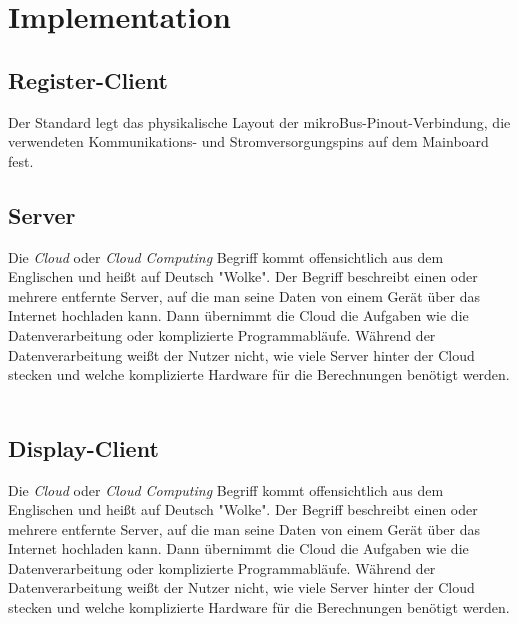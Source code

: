 \chapter{Implementation}

\section{Register-Client}
\label{sec:register_client}
Der Standard legt das physikalische Layout der mikroBus-Pinout-Verbindung, die verwendeten Kommunikations- und Stromversorgungspins auf dem Mainboard fest. 

\section{Server}
\label{sec:server}
Die \textit{Cloud} oder \textit{Cloud Computing} Begriff kommt offensichtlich aus dem Englischen und heißt auf Deutsch "Wolke". Der Begriff beschreibt einen oder mehrere entfernte Server, auf die man seine Daten von einem Gerät über das Internet hochladen kann. Dann übernimmt die Cloud die Aufgaben wie die Datenverarbeitung oder komplizierte Programmabläufe. Während der Datenverarbeitung weißt der Nutzer nicht, wie viele Server hinter der Cloud stecken und welche komplizierte Hardware für die Berechnungen benötigt werden.\\\\

\section{Display-Client}
\label{sec:display_client}
Die \textit{Cloud} oder \textit{Cloud Computing} Begriff kommt offensichtlich aus dem Englischen und heißt auf Deutsch "Wolke". Der Begriff beschreibt einen oder mehrere entfernte Server, auf die man seine Daten von einem Gerät über das Internet hochladen kann. Dann übernimmt die Cloud die Aufgaben wie die Datenverarbeitung oder komplizierte Programmabläufe. Während der Datenverarbeitung weißt der Nutzer nicht, wie viele Server hinter der Cloud stecken und welche komplizierte Hardware für die Berechnungen benötigt werden.\\\\